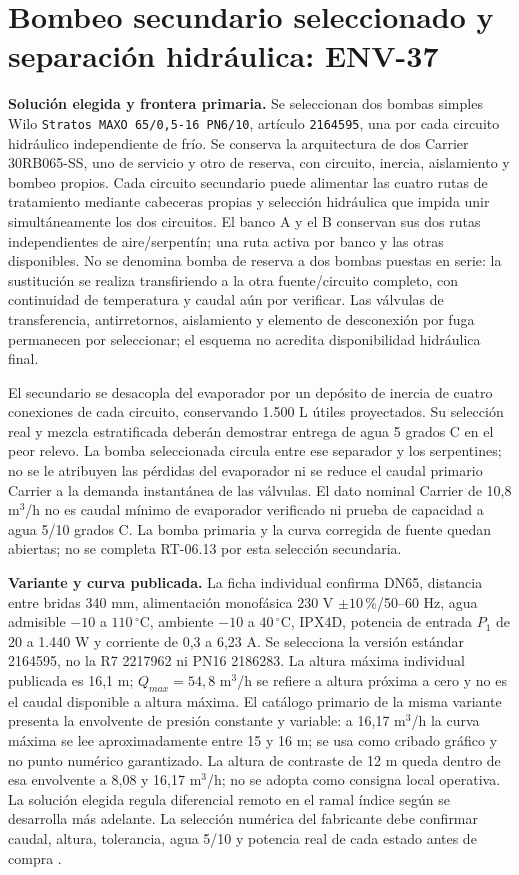 \section{Bombeo secundario seleccionado y separación hidráulica: ENV-37}
\label{sec:ambiente-env37}
\textbf{Solución elegida y frontera primaria.} Se seleccionan dos bombas simples Wilo \texttt{Stratos MAXO 65/0,5-16 PN6/10}, artículo \texttt{2164595}, una por cada circuito hidráulico independiente de frío. Se conserva la arquitectura de dos Carrier 30RB065-SS, uno de servicio y otro de reserva, con circuito, inercia, aislamiento y bombeo propios. Cada circuito secundario puede alimentar las cuatro rutas de tratamiento mediante cabeceras propias y selección hidráulica que impida unir simultáneamente los dos circuitos. El banco A y el B conservan sus dos rutas independientes de aire/serpentín; una ruta activa por banco y las otras disponibles. No se denomina bomba de reserva a dos bombas puestas en serie: la sustitución se realiza transfiriendo a la otra fuente/circuito completo, con continuidad de temperatura y caudal aún por verificar. Las válvulas de transferencia, antirretornos, aislamiento y elemento de desconexión por fuga permanecen por seleccionar; el esquema no acredita disponibilidad hidráulica final.

El secundario se desacopla del evaporador por un depósito de inercia de cuatro conexiones de cada circuito, conservando 1.500 L útiles proyectados. Su selección real y mezcla estratificada deberán demostrar entrega de agua 5 grados C en el peor relevo. La bomba seleccionada circula entre ese separador y los serpentines; no se le atribuyen las pérdidas del evaporador ni se reduce el caudal primario Carrier a la demanda instantánea de las válvulas. El dato nominal Carrier de 10,8 m$^3$/h no es caudal mínimo de evaporador verificado ni prueba de capacidad a agua 5/10 grados C. La bomba primaria y la curva corregida de fuente quedan abiertas; no se completa RT-06.13 por esta selección secundaria.

\textbf{Variante y curva publicada.} La ficha individual confirma DN65, distancia entre bridas 340 mm, alimentación monofásica 230 V $\pm10\,\%$/50--60 Hz, agua admisible $-10$ a $110\,^{\circ}$C, ambiente $-10$ a $40\,^{\circ}$C, IPX4D, potencia de entrada $P_1$ de 20 a 1.440 W y corriente de 0,3 a 6,23 A. Se selecciona la versión estándar 2164595, no la R7 2217962 ni PN16 2186283. La altura máxima individual publicada es 16,1 m; $Q_{max}=54,8$ m$^3$/h se refiere a altura próxima a cero y no es el caudal disponible a altura máxima. El catálogo primario de la misma variante presenta la envolvente de presión constante y variable: a 16,17 m$^3$/h la curva máxima se lee aproximadamente entre 15 y 16 m; se usa como cribado gráfico y no punto numérico garantizado. La altura de contraste de 12 m queda dentro de esa envolvente a 8,08 y 16,17 m$^3$/h; no se adopta como consigna local operativa. La solución elegida regula diferencial remoto en el ramal índice según se desarrolla más adelante. La selección numérica del fabricante debe confirmar caudal, altura, tolerancia, agua 5/10 y potencia real de cada estado antes de compra \parencite{lote37-wilo-producto}\parencite[p.~111]{lote37-wilo-curva}.


